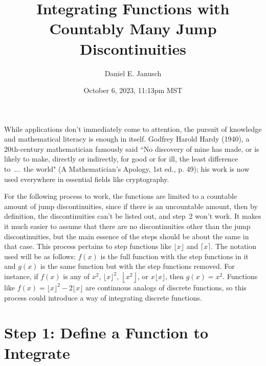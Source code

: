 \documentclass[12pt]{article}
\begin{document}
\title{Integrating Functions with Countably Many Jump Discontinuities}
\author{Daniel E. Janusch}
\date{October 6, 2023, 11:13pm MST}

\maketitle

	While applications don't immediately come to attention, the pursuit of knowledge and mathematical literacy
	is enough in itself. Godfrey Harold Hardy (1940), a 20th-century mathematician famously said ``No discovery
	of mine has made, or is likely to make, directly or indirectly, for good or for ill, the least difference
	to~...~the world" (A Mathematician's Apology, 1st ed., p. 49); his work is now used everywhere in essential
	fields like cryptography.

	For the following process to work, the functions are limited to a countable amount of jump discontinuities,
	since if there is an uncountable amount, then by definition, the discontinuities can't be listed out, and
	step~2 won't work. It makes it much easier to assume that there are no discontinuities other than the jump
	discontinuities, but the main essence of the steps should be about the same in that case. This process
	pertains to step functions like $\lfloor x\rfloor$ and $\lceil x\rceil$. The notation used will be as
	follows: $f(x)$ is the full function with the step functions in it and  $g(x)$ is the same function but
	with the step functions removed. For instance, if $f(x)$ is any of $x^2$, $\lfloor x\rfloor^2$,
	$\left\lfloor x^2\right\rfloor$, or $x\lfloor x\rfloor$, then $g(x)=x^2$. Functions like
	$f(x)=\lfloor x\rfloor^2-2\lfloor x\rfloor$ are continuous analogs of discrete functions, so this process
	could introduce a way of integrating discrete functions.

\section*{Step 1: Define a Function to Integrate}
\end{document}
